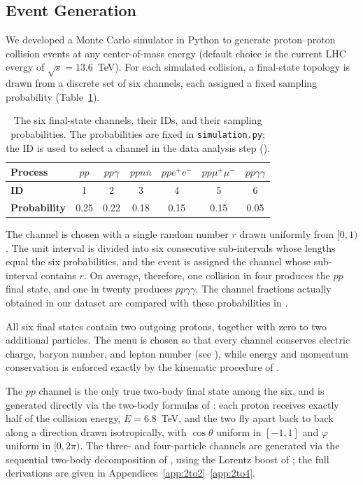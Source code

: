 \documentclass{article}
\begin{document}
\subsection{Event Generation}
\label{ssec:event_generation}
\par We developed a Monte Carlo simulator in Python to generate proton--proton collision events at any center-of-mass energy (default choice is the current LHC evergy of $\sqrt{s} = 13.6$~TeV). For each simulated collision, a final-state topology is drawn from a discrete set of six channels, each assigned a fixed sampling probability (Table~\ref{tab:channels}).

\begin{table}[H]
\centering
\begin{tabular}{l|c|c|c|c|c|c}
\hline
\textbf{Process} & $pp$ & $pp\gamma$ & $ppn\overline{n}$ & $ppe^+e^-$ & $pp\mu^+\mu^-$ & $pp\gamma\gamma$\\
\hline
\textbf{ID} & 1 & 2 & 3 & 4 & 5 & 6\\
\textbf{Probability} & 0.25 & 0.22 & 0.18 & 0.15 & 0.15 & 0.05\\
\hline
\end{tabular}
\caption{The six final-state channels, their IDs, and their sampling probabilities. The probabilities are fixed in \texttt{simulation.py}; the ID is used to select a channel in the data analysis step ().}
\label{tab:channels}
\end{table}

\par The channel is chosen with a single random number $r$ drawn uniformly from $[0, 1)$. The unit interval is divided into six consecutive sub-intervals whose lengths equal the six probabilities, and the event is assigned the channel whose sub-interval contains $r$. On average, therefore, one collision in four produces the $pp$ final state, and one in twenty produces $pp\gamma\gamma$. The channel fractions actually obtained in our dataset are compared with these probabilities in .

\par All six final states contain two outgoing protons, together with zero to two additional particles. The menu is chosen so that every channel conserves electric charge, baryon number, and lepton number (see ), while energy and momentum conservation is enforced exactly by the kinematic procedure of .

\par The $pp$ channel is the only true two-body final state among the six, and is generated directly via the two-body formulas of : each proton receives exactly half of the collision energy, $E = 6.8$~TeV, and the two fly apart back to back along a direction drawn isotropically, with $\cos\theta$ uniform in $[-1, 1]$ and $\varphi$ uniform in $[0, 2\pi)$. The three- and four-particle channels are generated via the sequential two-body decomposition of , using the Lorentz boost of ; the full derivations are given in Appendices~\ref{app:2to2}--\ref{app:2to4}.
\end{document}

